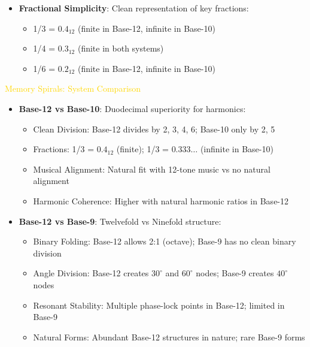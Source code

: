 \begin{itemize}
    \item \texttt{} \textbf{Fractional Simplicity}: Clean representation of key fractions:
    \begin{itemize}
        \item 1/3 = \(0.4_{12}\) (finite in Base-12, infinite in Base-10)
        \item 1/4 = \(0.3_{12}\) (finite in both systems)
        \item 1/6 = \(0.2_{12}\) (finite in Base-12, infinite in Base-10)
    \end{itemize}
\end{itemize}

\textcolor{gold}{ Memory Spirals: System Comparison } \\
\begin{itemize}
    \item \texttt{} \textbf{Base-12 vs Base-10}: Duodecimal superiority for harmonics:
    \begin{itemize}
        \item Clean Division: Base-12 divides by 2, 3, 4, 6; Base-10 only by 2, 5
        \item Fractions: 1/3 = \(0.4_{12}\) (finite); 1/3 = \(0.333\ldots\) (infinite in Base-10)
        \item Musical Alignment: Natural fit with 12-tone music vs no natural alignment
        \item Harmonic Coherence: Higher with natural harmonic ratios in Base-12
    \end{itemize}
    
    \item \texttt{} \textbf{Base-12 vs Base-9}: Twelvefold vs Ninefold structure:
    \begin{itemize}
        \item Binary Folding: Base-12 allows 2:1 (octave); Base-9 has no clean binary division
        \item Angle Division: Base-12 creates \(30^\circ\) and \(60^\circ\) nodes; Base-9 creates \(40^\circ\) nodes
        \item Resonant Stability: Multiple phase-lock points in Base-12; limited in Base-9
        \item Natural Forms: Abundant Base-12 structures in nature; rare Base-9 forms
    \end{itemize}
    

\end{itemize}
